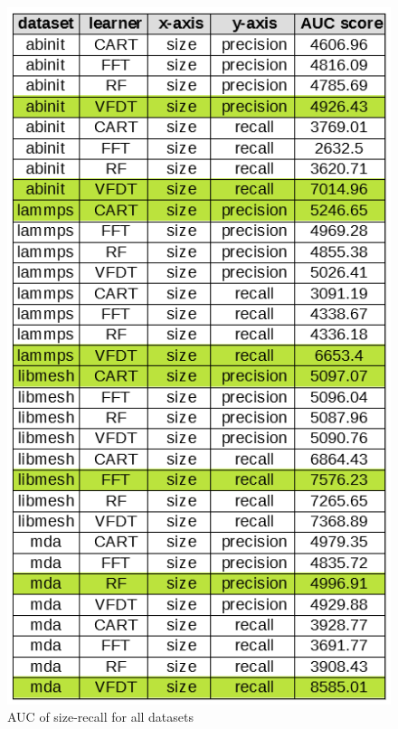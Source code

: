\documentclass[sigplan]{acmart}\settopmatter{printfolios=true,printccs=false,printacmref=false}
\begin{document}
\begin{figure}[h]
	\includegraphics[width=\linewidth]{fig/auc-size.png}
	\caption{AUC of size-recall for all datasets}
	\label{fig:auc-size}
\end{figure}
\end{document}
